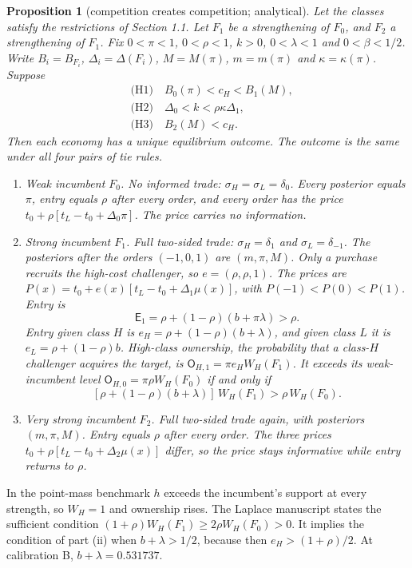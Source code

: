 \documentclass[11pt]{article}
\newtheorem{proposition}{Proposition}
\theoremstyle{definition}
\newcommand{\Ent}{\mathsf E}
\newcommand{\Own}{\mathsf O}
\begin{document}
\setcounter{proposition}{1}
\begin{proposition}[competition creates competition; analytical]\label{prop:2}
Let the classes satisfy the restrictions of Section 1.1. Let $F_1$ be a strengthening of $F_0$, and $F_2$ a
strengthening of $F_1$. Fix $0<\pi<1$, $0<\rho<1$, $k>0$, $0<\lambda<1$ and $0<\beta<1/2$. Write $B_i=B_{F_i}$,
$\Delta_i=\Delta(F_i)$, $M=M(\pi)$, $m=m(\pi)$ and $\kappa=\kappa(\pi)$. Suppose
\begin{align*}
&\text{(H1)}\quad B_0(\pi)<c_H<B_1(M),\\
&\text{(H2)}\quad \Delta_0<k<\rho\kappa\Delta_1,\\
&\text{(H3)}\quad B_2(M)<c_H.
\end{align*}
Then each economy has a unique equilibrium outcome. The outcome is the same under all four pairs of tie rules.
\begin{enumerate}[label=(\roman*)]
\item \emph{Weak incumbent $F_0$.} No informed trade: $\sigma_H=\sigma_L=\delta_0$. Every posterior equals $\pi$,
  entry equals $\rho$ after every order, and every order has the price $t_0+\rho[t_L-t_0+\Delta_0\pi]$.
  The price carries no information.
\item \emph{Strong incumbent $F_1$.} Full two-sided trade: $\sigma_H=\delta_1$ and $\sigma_L=\delta_{-1}$. The
  posteriors after the orders $(-1,0,1)$ are $(m,\pi,M)$. Only a purchase recruits the high-cost challenger,
  so $e=(\rho,\rho,1)$. The prices are $P(x)=t_0+e(x)[t_L-t_0+\Delta_1\mu(x)]$, with $P(-1)<P(0)<P(1)$. Entry is
  \[
  \Ent_1=\rho+(1-\rho)(b+\pi\lambda)>\rho .
  \]
  Entry given class $H$ is $e_H=\rho+(1-\rho)(b+\lambda)$, and given class $L$ it is $e_L=\rho+(1-\rho)b$.
  High-class ownership, the probability that a class-$H$ challenger acquires the target, is
  $\Own_{H,1}=\pi e_HW_H(F_1)$. It exceeds its weak-incumbent level $\Own_{H,0}=\pi\rho W_H(F_0)$ if and only if
  \[
  [\rho+(1-\rho)(b+\lambda)]\,W_H(F_1)>\rho\,W_H(F_0).
  \]
\item \emph{Very strong incumbent $F_2$.} Full two-sided trade again, with posteriors $(m,\pi,M)$. Entry equals
  $\rho$ after every order. The three prices $t_0+\rho[t_L-t_0+\Delta_2\mu(x)]$ differ, so the price stays
  informative while entry returns to $\rho$.
\end{enumerate}
\end{proposition}

In the point-mass benchmark $h$ exceeds the incumbent's support at every strength, so $W_H=1$ and ownership rises.
The Laplace manuscript states the sufficient condition $(1+\rho)W_H(F_1)\ge2\rho W_H(F_0)>0$. It implies the
condition of part (ii) when $b+\lambda>1/2$, because then $e_H>(1+\rho)/2$. At calibration B, $b+\lambda=0.531737$.
\end{document}
